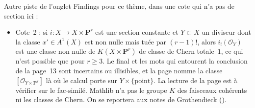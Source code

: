 \bigskip
\noindent Autre piste de l'onglet Findings pour ce thème, dans une cote qui n'a pas de section ici :
\begin{itemize}\small\setlength{\itemsep}{0pt}
\item Cote~2 : si $i : X \to X \times \mathbf P^r$ est une section constante et $Y \subset X$ un diviseur dont la classe $x' \in A^1(X)$ est non nulle mais tuée par $(r-1)!$, alors $i_!(\mathcal O_Y)$ est une classe non nulle de $K(X \times \mathbf P^r)$ de classe de Chern totale~$1$, ce qui n'est possible que pour $r \geq 3$. Le  final et les mots qui entourent la conclusion de la page~13 sont incertains ou illisibles, et la page nomme la classe $[\mathcal O_{Y \times \mathbf P^r}]$ là où le calcul porte sur $Y \times \{\text{point}\}$. La lecture de la page est à vérifier sur le fac-similé. Mathlib n'a pas le groupe $K$ des faisceaux cohérents ni les classes de Chern. On se reportera aux notes de Grothendieck ().
\end{itemize}
